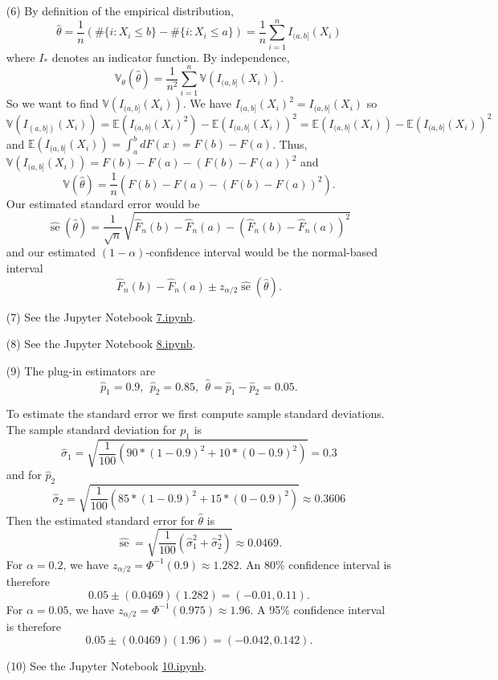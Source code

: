 \documentclass[10pt]{article}
\newcommand{\V}{\mathbb{V}}
\newcommand{\E}{\mathbb{E}}
\newcommand{\se}{\operatorname{se}}
\begin{document}
\begin{enumerate}[(1)]
\item[(6)]
By definition of the empirical distribution,
\[
\hat \theta = \frac{1}{n} (\#\{i : X_i \leq b\} - \#\{i : X_i \leq a\})
=\frac{1}{n} \sum_{i=1}^n I_{(a,b]}(X_i)
\]
where $I_*$ denotes an indicator function. By independence,
\[
\V_\theta(\hat \theta) = \frac{1}{n^2} \sum_{i=1}^n \V(I_{(a,b]}(X_i)).
\]
So we want to find $\V(I_{(a,b]}(X_i))$. We have $I_{(a,b]}(X_i)^2=I_{(a,b]}(X_i)$
so
\[
\V(I_{(a,b])}(X_i)) = \E(I_{(a,b]}(X_i)^2) - \E(I_{(a,b]}(X_i))^2
= \E(I_{(a,b]}(X_i)) - \E(I_{(a,b]}(X_i))^2
\]
and $\E(I_{(a,b]}(X_i))=\int_a^b dF(x)=F(b)-F(a)$. Thus,
$\V(I_{(a,b]}(X_i))=F(b)-F(a) - (F(b)-F(a))^2$ and
\[
\V(\hat \theta) = \frac{1}{n}\left(F(b)-F(a) - \left(F(b)-F(a)\right)^2\right).
\]
Our estimated standard error would be
\[
\widehat{\se}(\hat \theta) = \frac{1}{\sqrt{n}}\sqrt{\hat F_n(b) - \hat F_n(a) -
(\hat F_n(b) - \hat F_n(a))^2}
\]
and our estimated $(1-\alpha)$-confidence interval would be the normal-based
interval
\[
\hat F_n(b) - \hat F_n(a) \pm z_{\alpha/2}\widehat{\se}(\hat \theta).
\]

\item[(7)]
See the Jupyter Notebook
\href{https://github.com/ajrasmus/some_of_statistics/blob/main/chapter_7/7.ipynb}{7.ipynb}.

\item[(8)]
See the Jupyter Notebook
\href{https://github.com/ajrasmus/some_of_statistics/blob/main/chapter_7/8.ipynb}{8.ipynb}.

\item[(9)]
The plug-in estimators are
\[
\hat p_1 = 0.9, \ \ \hat p_2 = 0.85,  \ \ \hat \theta = \hat p_1-\hat p_2 = 0.05.
\]

To estimate the standard error we first compute sample standard deviations.
The sample standard deviation for $p_1$ is
\[
\hat \sigma_1 = \sqrt{\frac{1}{100} (90 * (1 - 0.9)^2 + 10 * (0 - 0.9)^2)} = 0.3
\]
and for $\hat p_2$
\[
\hat \sigma_2 = \sqrt{\frac{1}{100} (85 * (1 - 0.9)^2 + 15 * (0 - 0.9)^2)} \approx
0.3606
\]
Then the estimated standard error for $\hat \theta$ is
\[
\widehat{\se} = \sqrt{\frac{1}{100}\left(\hat \sigma_1^2 + \hat \sigma_2^2\right)}
\approx 0.0469.
\]
For $\alpha=0.2$, we have $z_{\alpha/2}=\Phi^{-1}(0.9) \approx 1.282$. An 80\%
confidence interval is therefore
\[
0.05 \pm (0.0469)(1.282) = (-0.01, 0.11).
\]
For $\alpha=0.05$, we have $z_{\alpha/2}=\Phi^{-1}(0.975) \approx 1.96$. A 95\%
confidence interval is therefore
\[
0.05 \pm (0.0469)(1.96) = (-0.042, 0.142).
\]

\item[(10)]
See the Jupyter Notebook
\href{https://github.com/ajrasmus/some_of_statistics/blob/main/chapter_7/10.ipynb}{10.ipynb}.

\end{enumerate}
\end{document}
